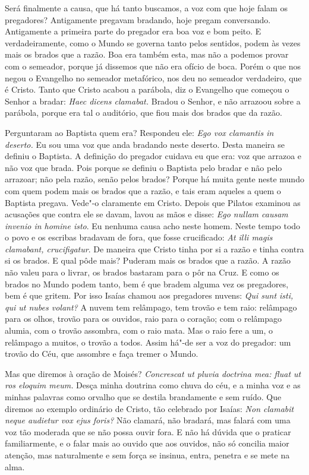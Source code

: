 Será finalmente a causa, que há tanto buscamos, a voz com que hoje falam
os pregadores? Antigamente pregavam bradando, hoje
pregam conversando. Antigamente a primeira parte do pregador era boa voz
e bom peito. E verdadeiramente, como o Mundo se governa tanto pelos
sentidos, podem às vezes mais os brados que a razão. Boa era também
esta, mas não a podemos provar com o semeador, porque já dissemos que
não era ofício de boca. Porém o que nos negou o Evangelho no semeador
metafórico, nos deu no semeador verdadeiro, que é Cristo. Tanto que
Cristo acabou a parábola, diz o Evangelho que começou o Senhor a bradar:
\emph{Haec dicens clamabat.} Bradou o Senhor, e não arrazoou sobre a
parábola, porque era tal o auditório, que fiou mais dos brados que da
razão.

Perguntaram ao Baptista quem era? Respondeu ele: \emph{Ego vox clamantis
in deserto.} Eu sou uma voz que anda bradando neste deserto. Desta
maneira se definiu o Baptista. A definição do pregador cuidava eu que
era: voz que arrazoa e não voz que brada. Pois porque se definiu o
Baptista pelo bradar e não pelo arrazoar; não pela razão, senão pelos
brados? Porque há muita gente neste mundo com quem podem mais os brados
que a razão, e tais eram aqueles a quem o Baptista pregava. Vede"-o
claramente em Cristo. Depois que Pilatos examinou as acusações que
contra ele se davam, lavou as mãos e disse: \emph{Ego nullam causam
invenio in homine isto}. Eu nenhuma causa acho neste homem. Neste
tempo todo o povo e os escribas bradavam de fora, que fosse crucificado:
\emph{At illi magis clamabant, crucifigatur}. De maneira que Cristo
tinha por si a razão e tinha contra si os brados. E qual pôde mais?
Puderam mais os brados que a razão. A razão não valeu para o livrar, os
brados bastaram para o pôr na Cruz. E como os brados no Mundo podem
tanto, bem é que bradem alguma vez os pregadores, bem é que gritem. Por
isso Isaías chamou aos pregadores nuvens: \emph{Qui sunt isti, qui
ut nubes volant?} A nuvem tem relâmpago, tem trovão e tem raio:
relâmpago para os olhos, trovão para os ouvidos, raio para o coração;
com o relâmpago alumia, com o trovão assombra, com o raio mata. Mas o
raio fere a um, o relâmpago a muitos, o trovão a todos. Assim há"-de ser
a voz do pregador: um trovão do Céu, que assombre e faça tremer o
Mundo.

Mas que diremos à oração de Moisés? \emph{Concrescat ut pluvia doctrina
mea: fluat ut ros eloquim meum.} Desça minha doutrina
como chuva do céu, e a minha voz e as minhas palavras como orvalho que
se destila brandamente e sem ruído. Que diremos ao exemplo ordinário
de Cristo, tão celebrado por Isaías: \emph{Non clamabit neque audietur
vox ejus foris?} Não clamará, não bradará, mas falará com uma voz tão
moderada que se não possa ouvir fora. E não há dúvida que o praticar
familiarmente, e o falar mais ao ouvido que aos ouvidos, não só concilia
maior atenção, mas naturalmente e sem força se insinua, entra, penetra e
se mete na alma.

